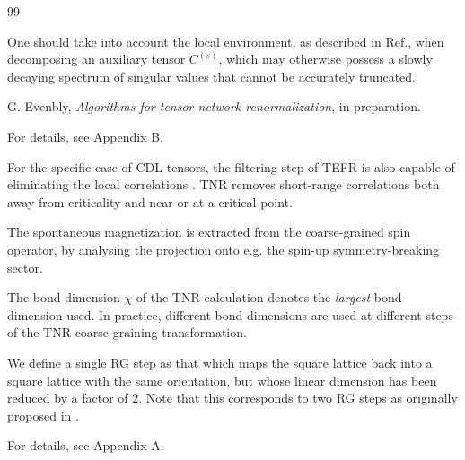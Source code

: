 \documentclass[aps,prl,twocolumn,showpacs,superscriptaddress,floatfix,10pt]{revtex4-1}
\begin{document}
\begin{thebibliography}{99}

 One should take into account the local environment, as described in Ref.\cite{TRGenv}, when decomposing an auxiliary tensor $C^{(s)}$, which may otherwise possess a slowly decaying spectrum of singular values that cannot be accurately truncated.

 G. Evenbly, \textit{Algorithms for tensor network renormalization}, in preparation.

 For details, see Appendix B.

 For the specific case of CDL tensors, the filtering step of TEFR \cite{TEFR} is also capable of eliminating the local correlations \cite{filterCDL}. TNR removes short-range correlations both away from criticality and near or at a critical point.

 The spontaneous magnetization is extracted from the coarse-grained spin operator, by analysing the projection onto e.g. the spin-up symmetry-breaking sector.

 The bond dimension $\chi$ of the TNR calculation denotes the \emph{largest} bond dimension used. In practice, different bond dimensions are used at different steps of the TNR coarse-graining transformation. 

 We define a single RG step as that which maps the square lattice back into a square lattice with the same orientation, but whose linear dimension has been reduced by a factor of 2. Note that this corresponds to two RG steps as originally proposed in \cite{TRG}.


 For details, see Appendix A.


\end{thebibliography}
\end{document}
